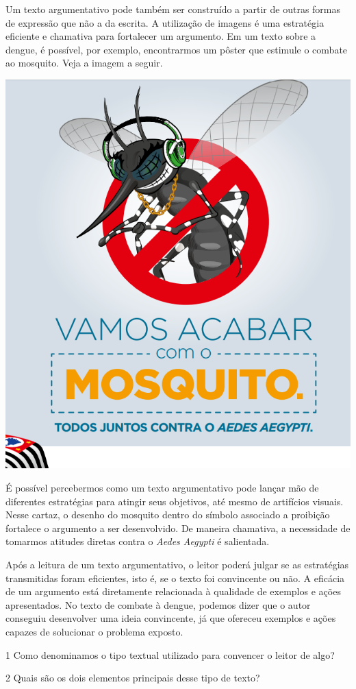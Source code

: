 {Um texto argumentativo pode também ser construído a partir de outras
formas de expressão que não a da escrita. A utilização de imagens é uma
estratégia eficiente e chamativa para fortalecer um argumento. Em um
texto sobre a dengue, é possível, por exemplo, encontrarmos um pôster
que estimule o combate ao mosquito. Veja a imagem a seguir.

\includegraphics[width=.5\textwidth]{./imgs/img11.png}

É possível percebermos como um texto argumentativo pode lançar mão de
diferentes estratégias para atingir seus objetivos, até mesmo de
artifícios visuais. Nesse cartaz, o desenho do mosquito dentro do
símbolo associado a proibição fortalece o argumento a ser desenvolvido.
De maneira chamativa, a necessidade de tomarmos atitudes diretas contra o
\textit{Aedes Aegypti} é salientada.

Após a leitura de um texto argumentativo, o leitor poderá julgar se as
estratégias transmitidas foram eficientes, isto é, se o texto foi
convincente ou não. A eficácia de um argumento está diretamente
relacionada à qualidade de exemplos e ações apresentados. No texto de
combate à dengue, podemos dizer que o autor conseguiu desenvolver uma
ideia convincente, já que ofereceu exemplos e ações capazes de
solucionar o problema exposto.}


\num{1} Como denominamos o tipo textual utilizado para convencer o leitor
de algo?


\num{2} Quais são os dois elementos principais desse tipo de texto?



